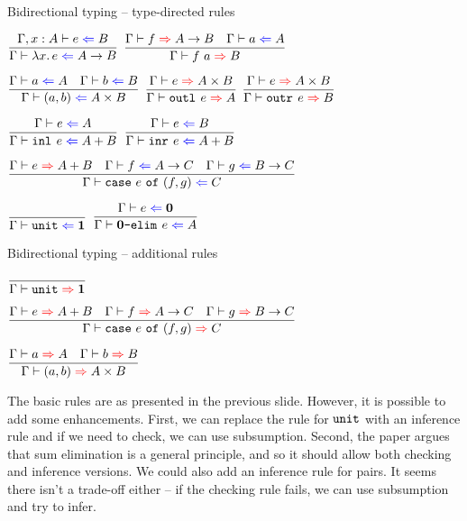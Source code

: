 \documentclass{beamer}
\begin{document}
\begin{frame}{Bidirectional typing -- type-directed rules}

\begin{center}
  $\infrule{\check[\extend{\Gamma}{x}{A}]{e}{B}}{\check{\fun{x}{e}}{\Fun{A}{B}}}$ \quad
  $\infrule{\infer{f}{\Fun{A}{B}} \quad \check{a}{A}}{\infer{\app{f}{a}}{B}}$

  \vspace{2em}

  $\infrule{\check{a}{A} \quad \check{b}{B}}{\check{\pair{a}{b}}{\Prod{A}{B}}}$ \quad
  $\infrule{\infer{e}{\Prod{A}{B}}}{\infer{\outl{e}}{A}}$ \quad
  $\infrule{\infer{e}{\Prod{A}{B}}}{\infer{\outr{e}}{B}}$

  \vspace{2em}

  $\infrule{\check{e}{A}}{\check{\inl{e}}{\Sum{A}{B}}}$ \quad
  $\infrule{\check{e}{B}}{\check{\inr{e}}{\Sum{A}{B}}}$

  \vspace{2em}

  $\infrule{\infer{e}{\Sum{A}{B}} \quad \check{f}{\Fun{A}{C}} \quad \check{g}{\Fun{B}{C}}}{\check{\case{e}{f}{g}}{C}}$

  \vspace{2em}

  $\infrule{}{\check{\unit}{\Unit}}$ \quad
  $\infrule{\check{e}{\Empty}}{\check{\emptyelim{e}}{A}}$
\end{center}

\end{frame}

\begin{frame}{Bidirectional typing -- additional rules}

\begin{center}
  $\infrule{}{\infer{\unit}{\Unit}}$

  \vspace{1em}

  $\infrule{\infer{e}{\Sum{A}{B}} \quad \infer{f}{\Fun{A}{C}} \quad \infer{g}{\Fun{B}{C}}}{\infer{\case{e}{f}{g}}{C}}$

  \vspace{1em}

  $\infrule{\infer{a}{A} \quad \infer{b}{B}}{\infer{\pair{a}{b}}{\Prod{A}{B}}}$
\end{center}

\vspace{1em}

The basic rules are as presented in the previous slide. However, it is possible to add some enhancements. First, we can replace the rule for $\texttt{unit}$ with an inference rule and if we need to check, we can use subsumption. Second, the paper argues that sum elimination is a general principle, and so it should allow both checking and inference versions. We could also add an inference rule for pairs. It seems there isn't a trade-off either -- if the checking rule fails, we can use subsumption and try to infer.

\end{frame}
\end{document}
